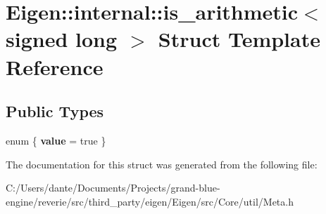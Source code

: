 \hypertarget{struct_eigen_1_1internal_1_1is__arithmetic_3_01signed_01long_01_4}{}\section{Eigen\+::internal\+::is\+\_\+arithmetic$<$ signed long $>$ Struct Template Reference}
\label{struct_eigen_1_1internal_1_1is__arithmetic_3_01signed_01long_01_4}
\subsection*{Public Types}
\begin{DoxyCompactItemize}
\item 
\mbox{\label{struct_eigen_1_1internal_1_1is__arithmetic_3_01signed_01long_01_4_aed48ac9f0fa9b4c6b7d1d0f3fa920322}} 
enum \{ {\bfseries value} = true
 \}
\end{DoxyCompactItemize}


The documentation for this struct was generated from the following file\+:\begin{DoxyCompactItemize}
\item 
C\+:/\+Users/dante/\+Documents/\+Projects/grand-\/blue-\/engine/reverie/src/third\+\_\+party/eigen/\+Eigen/src/\+Core/util/Meta.\+h\end{DoxyCompactItemize}
